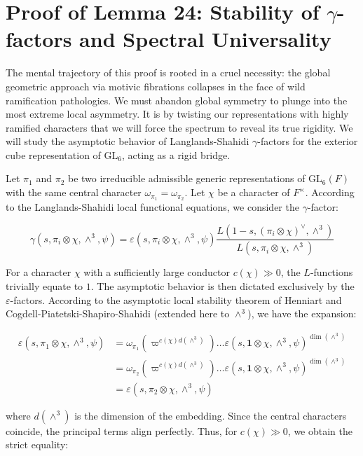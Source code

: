 \documentclass[
]{article}
\begin{document}
\section{Proof of Lemma 24: Stability of $\gamma$-factors and Spectral Universality}

The mental trajectory of this proof is rooted in a cruel necessity: the global geometric approach via motivic fibrations collapses in the face of wild ramification pathologies. We must abandon global symmetry to plunge into the most extreme local asymmetry. It is by twisting our representations with highly ramified characters that we will force the spectrum to reveal its true rigidity. We will study the asymptotic behavior of Langlands-Shahidi $\gamma$-factors for the exterior cube representation of $\mathrm{GL}_6$, acting as a rigid bridge.

Let $\pi_1$ and $\pi_2$ be two irreducible admissible generic representations of $\mathrm{GL}_6(F)$ with the same central character $\omega_{\pi_1} = \omega_{\pi_2}$. Let $\chi$ be a character of $F^\times$. According to the Langlands-Shahidi local functional equations, we consider the $\gamma$-factor:

\begin{equation*}
\gamma(s, \pi_i \otimes \chi, \wedge^3, \psi) = \varepsilon(s, \pi_i \otimes \chi, \wedge^3, \psi) \frac{L(1-s, (\pi_i \otimes \chi)^\vee, \wedge^3)}{L(s, \pi_i \otimes \chi, \wedge^3)}
\end{equation*}

For a character $\chi$ with a sufficiently large conductor $c(\chi) \gg 0$, the $L$-functions trivially equate to $1$. The asymptotic behavior is then dictated exclusively by the $\varepsilon$-factors. According to the asymptotic local stability theorem of Henniart and Cogdell-Piatetski-Shapiro-Shahidi (extended here to $\wedge^3$), we have the expansion:

\begin{align*}
\varepsilon(s, \pi_1 \otimes \chi, \wedge^3, \psi) &= \omega_{\pi_1}(\varpi^{c(\chi) d(\wedge^3)}) \dots \varepsilon(s, \mathbf{1} \otimes \chi, \wedge^3, \psi)^{\operatorname{dim}(\wedge^3)} \\
&= \omega_{\pi_2}(\varpi^{c(\chi) d(\wedge^3)}) \dots \varepsilon(s, \mathbf{1} \otimes \chi, \wedge^3, \psi)^{\operatorname{dim}(\wedge^3)} \\
&= \varepsilon(s, \pi_2 \otimes \chi, \wedge^3, \psi)
\end{align*}

where $d(\wedge^3)$ is the dimension of the embedding. Since the central characters coincide, the principal terms align perfectly. Thus, for $c(\chi) \gg 0$, we obtain the strict equality:
\end{document}
